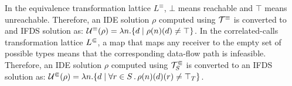
In the equivalence transformation lattice $L^\equiv$, $\bot$ means reachable
and $\top$ means unreachable.
Therefore, an IDE solution $\rho$ computed using $\mathcal T^\equiv$ is converted to
and IFDS solution as:
  $\mathcal U^\equiv(\rho) = \lambda n.\{d\mid\rho(n)(d)\ne\top\}$.
%
%
In the correlated-calls transformation lattice $L^\Subset$, a map that maps any receiver
to the empty set of possible types means that the corresponding data-flow path is
infeasible. Therefore, an IDE solution $\rho$ computed using
$\mathcal T^\Subset_S$ is converted to an IFDS solution as:
$\mathcal U^\Subset(\rho) = \lambda n.\{d\mid\forall r\in S\,.\,\rho(n)(d)(r)\neq\top_T\}$.


